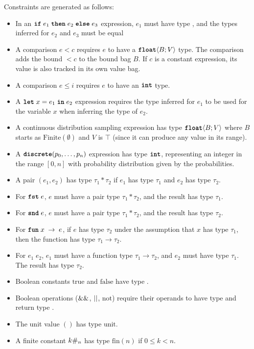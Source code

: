 Constraints are generated as follows:
\begin{itemize}
    \item In an $\text{\ttfamily\bfseries if} \; e_1\; \text{\ttfamily\bfseries then} \; e_2\; \text{\ttfamily\bfseries else} \; e_3$ expression, $e_1$ must have type \bool, and the types inferred for $e_2$ and $e_3$ must be equal
    \item A comparison $e < c$ requires $e$ to have a $\text{\ttfamily\bfseries float}\langle B; V \rangle$ type. The comparison adds the bound $<c$ to the bound bag $B$. If $c$ is a constant expression, its value is also tracked in its own value bag.
    \item A comparison $e \leq i$ requires $e$ to have an $\text{\ttfamily\bfseries int}$ type.
    \item A $\text{\ttfamily\bfseries let} \; x = e_1 \; \text{\ttfamily\bfseries in} \; e_2$ expression requires the type inferred for $e_1$ to be used for the variable $x$ when inferring the type of $e_2$.
    \item A continuous distribution sampling expression has type $\text{\ttfamily\bfseries float}\langle B; V \rangle$ where $B$ starts as $\text{Finite}(\emptyset)$ and $V$ is $\top$ (since it can produce any value in its range).
    \item A $\text{\ttfamily\bfseries discrete}(p_0, \ldots, p_n)$ expression has type $\text{\ttfamily\bfseries int}$, representing an integer in the range $[0,n]$ with probability distribution given by the probabilities.
    \item A pair $(e_1, e_2)$ has type $\tau_1 * \tau_2$ if $e_1$ has type $\tau_1$ and $e_2$ has type $\tau_2$.
    \item For $\text{\ttfamily\bfseries fst} \; e$, $e$ must have a pair type $\tau_1 * \tau_2$, and the result has type $\tau_1$.
    \item For $\text{\ttfamily\bfseries snd} \; e$, $e$ must have a pair type $\tau_1 * \tau_2$, and the result has type $\tau_2$.
    \item For $\text{\ttfamily\bfseries fun} \; x \; \rightarrow \; e$, if $e$ has type $\tau_2$ under the assumption that $x$ has type $\tau_1$, then the function has type $\tau_1 \rightarrow \tau_2$.
    \item For $e_1 \; e_2$, $e_1$ must have a function type $\tau_1 \rightarrow \tau_2$, and $e_2$ must have type $\tau_1$. The result has type $\tau_2$.
    \item Boolean constants $\text{true}$ and $\text{false}$ have type \bool.
    \item Boolean operations ($\mathrel{\&\&}$, $\mathrel{||}$, $\text{not}$) require their operands to have type \bool{} and return type \bool.
    \item The unit value $()$ has type $\text{unit}$.
    \item A finite constant $k\#_{n}$ has type $\text{fin}(n)$ if $0 \leq k < n$.

\end{itemize}
